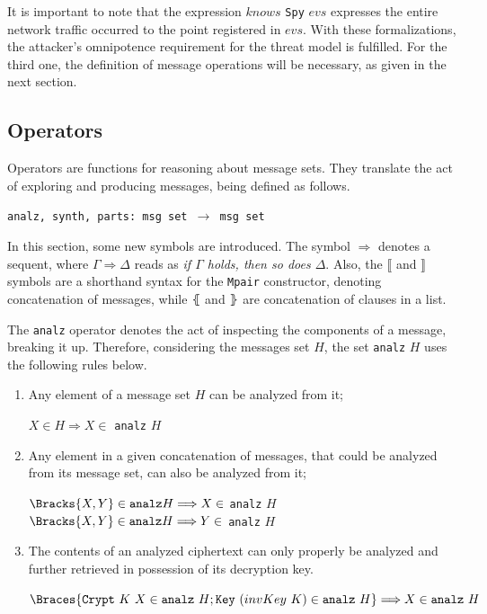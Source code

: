 It is important to note that the expression \(knows\) \texttt{Spy} \(evs\) expresses the entire network traffic occurred to the point registered in \(evs\). With these formalizations, the attacker's omnipotence requirement for the threat model is fulfilled. For the third one, the definition of message operations will be necessary, as given in the next section.



\subsection{Operators}\label{ssec:operators}
Operators are functions for reasoning about message sets. They translate the act of exploring and producing messages, being defined as follows.

\begin{center}
  \texttt{analz, synth, parts: msg set \(\longrightarrow \) msg set}
\end{center}

In this section, some new symbols are introduced. The symbol \(\Longrightarrow \) denotes a sequent, where \(\Gamma \Longrightarrow \Delta \) reads as {\em if \(\Gamma \) holds, then so does \(\Delta \)}. Also, the \(\lBrack \) and \(\rBrack \) symbols are a shorthand syntax for the \texttt{Mpair} constructor, denoting concatenation of messages, while \(\lBrace \) and \(\rBrace \) are concatenation of clauses in a list.

The \texttt{analz} operator denotes the act of inspecting the components of a message, breaking it up. Therefore, considering the messages set \(H\), the set \texttt{analz} \(H\) uses the following rules below.

\begin{enumerate}
  \item Any element of a message set \(H\) can be analyzed from it;
  \begin{center}
    \(X \in H \Longrightarrow X \in \) \texttt{analz} \(H\)
  \end{center}

  \item Any element in a given concatenation of messages, that could be analyzed from its message set, can also be analyzed from it;
  \begin{center}
    \(\Bracks{X,Y} \in \texttt{analz} H \Longrightarrow X \in \) \texttt{analz} \(H\) \\
    \(\Bracks{X,Y} \in \texttt{analz} H \Longrightarrow Y \in \) \texttt{analz} \(H\)
  \end{center}

  \item The contents of an analyzed ciphertext can only properly be analyzed and further retrieved in possession of its decryption key.
  \begin{center}
    \(\Braces{\texttt{Crypt}\ K\ X \in \texttt{analz}\ H; \texttt{Key}\ (invKey\ K) \in \texttt{analz}\ H} \Longrightarrow X \in \texttt{analz}\ H\)
  \end{center}
\end{enumerate}

